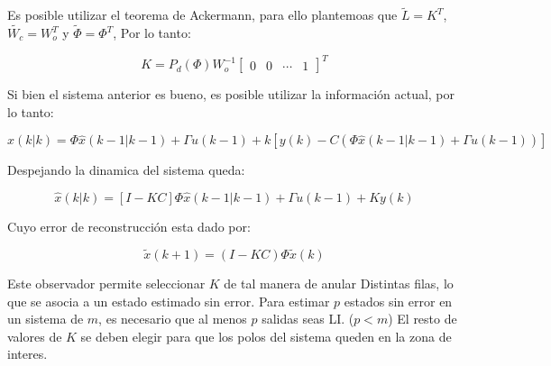 Es posible utilizar el teorema de Ackermann, para ello plantemoas que $\tilde{L}=K^T$, $\tilde{W_c}=W_o^T$ y 
$\tilde{\Phi}=\Phi^T$, Por lo tanto: 

\begin{equation}
    K = P_d(\Phi)W_o^{-1}
    \begin{bmatrix}
        0 & 0 & \cdots & 1
    \end{bmatrix}^T
\end{equation}

Si bien el sistema anterior es bueno, es posible utilizar la información actual, por lo tanto: 

\begin{equation}
    \hat{x}(k|k) = \Phi \hat{x}(k-1|k-1) + \Gamma u(k-1) + k[y(k) - C(\Phi \hat{x}(k-1|k-1) + \Gamma u(k-1))]
\end{equation}

Despejando la dinamica del sistema queda: 

\begin{equation}
    \hat{x}(k|k) = [I-KC]\Phi \hat{x}(k-1|k-1) + \Gamma u(k-1) +  Ky(k)
\end{equation}

Cuyo error de reconstrucción esta dado por: 

\begin{equation}
    \tilde{x}(k+1) = (I-KC)\Phi\tilde{x}(k)
\end{equation}

Este observador permite seleccionar $K$ de tal manera de anular 
Distintas filas, lo que se asocia a un estado estimado sin error.
Para estimar $p$ estados sin error en un sistema de $m$, 
es necesario que al menos $p$ salidas seas LI. ($p<m$)
El resto de valores de $K$ se deben elegir para que los polos del sistema 
queden en la zona de interes.

